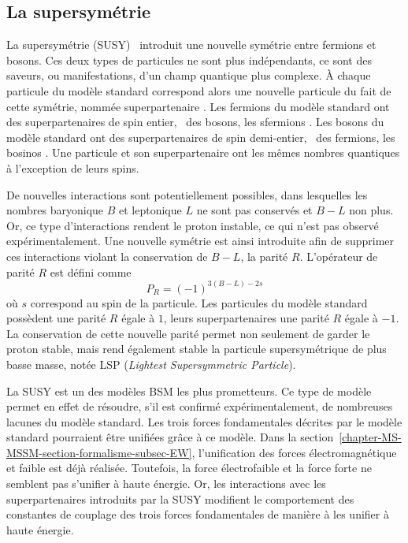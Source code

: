 \subsection{La supersymétrie}\label{chapter-MS-MSSM-section-BSM-subsec-SUSY}
La supersymétrie (SUSY)~\cite{susy_golfand,susy_wess,MARTIN_1998} introduit une nouvelle symétrie entre fermions et bosons.
Ces deux types de particules ne sont plus indépendants, ce sont des saveurs, ou manifestations, d'un champ quantique plus complexe.
À chaque particule du modèle standard correspond alors une nouvelle particule du fait de cette symétrie, nommée \og superpartenaire \fg.
Les fermions du modèle standard ont des superpartenaires de spin entier, \ie\ des bosons, les \og sfermions \fg.
Les bosons du modèle standard ont des superpartenaires de spin demi-entier, \ie\ des fermions, les \og bosinos \fg.
Une particule et son superpartenaire ont les mêmes nombres quantiques à l'exception de leurs spins.
\par De nouvelles interactions sont potentiellement possibles, dans lesquelles les nombres baryonique $B$ et leptonique $L$ ne sont pas conservés et $B-L$ non plus.
Or, ce type d'interactions rendent le proton instable, ce qui n'est pas observé expérimentalement.
Une nouvelle symétrie est ainsi introduite afin de supprimer ces interactions violant la conservation de $B-L$, la parité $R$.
L'opérateur de parité $R$ est défini comme
\begin{equation}
P_R = (-1)^{3(B-L)-2s}
\end{equation}
où $s$ correspond au spin de la particule.
Les particules du modèle standard possèdent une parité $R$ égale à $1$, leurs superpartenaires une parité $R$ égale à $-1$.
La conservation de cette nouvelle parité permet non seulement de garder le proton stable, mais rend également stable la particule supersymétrique de plus basse masse, notée LSP (\emph{Lightest Supersymmetric Particle}).
\par La SUSY est un des modèles BSM les plus prometteurs.
Ce type de modèle permet en effet de résoudre, s'il est confirmé expérimentalement, de nombreuses lacunes du modèle standard.
Les trois forces fondamentales décrites par le modèle standard pourraient être unifiées grâce à ce modèle.
Dans la section~\ref{chapter-MS-MSSM-section-formalisme-subsec-EW}, l'unification des forces électromagnétique et faible est déjà réalisée.
Toutefois, la force électrofaible et la force forte ne semblent pas s'unifier à haute énergie.
Or, les interactions avec les superpartenaires introduits par la SUSY modifient le comportement des constantes de couplage des trois forces fondamentales de manière à les unifier à haute énergie.
